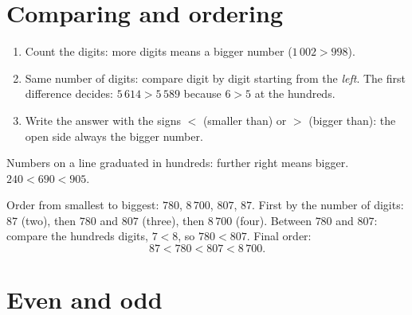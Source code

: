\section{Comparing and ordering}

\begin{method}\label{met:g3:numbers:compare}
\begin{enumerate}
  \item Count the digits: more digits means a bigger number
        ($1\,002 > 998$).
  \item Same number of digits: compare digit by digit starting from
        the \emph{left}. The first difference decides:
        $5\,614 > 5\,589$ because $6 > 5$ at the hundreds.
  \item Write the answer with the signs $<$ (smaller than) or $>$
        (bigger than): the open side always  the bigger number.
\end{enumerate}
\end{method}

\begin{omfigure}

{\small Numbers on a line graduated in hundreds: further right means
bigger. $240 < 690 < 905$.}
\end{omfigure}

\begin{example}\label{ex:g3:numbers:order}
Order from smallest to biggest: $780$, $8\,700$, $807$, $87$.
First by the number of digits: $87$ (two), then $780$ and $807$
(three), then $8\,700$ (four). Between $780$ and $807$: compare the
hundreds digits, $7 < 8$, so $780 < 807$. Final order:
\[
87 < 780 < 807 < 8\,700 .
\]
\end{example}

\section{Even and odd}

